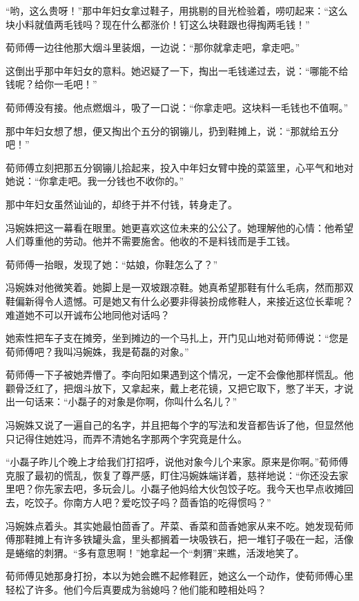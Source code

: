 \par “哟，这么贵呀！”那中年妇女拿过鞋子，用挑剔的目光检验着，唠叨起来：“这么块小料就值两毛钱吗？现在什么都涨价！钉这么块鞋跟也得掏两毛钱！”
\par 荀师傅一边往他那大烟斗里装烟，一边说：“那你就拿走吧，拿走吧。”
\par 这倒出乎那中年妇女的意料。她迟疑了一下，掏出一毛钱递过去，说：“哪能不给钱呢？给你一毛吧！”
\par 荀师傅没有接。他点燃烟斗，吸了一口说：“你拿走吧。这块料一毛钱也不值啊。”
\par 那中年妇女想了想，便又掏出个五分的钢镚儿，扔到鞋摊上，说：“那就给五分吧！”
\par 荀师傅立刻把那五分钢镚儿拾起来，投入中年妇女臂中挽的菜篮里，心平气和地对她说：“你拿走吧。我一分钱也不收你的。”
\par 那中年妇女虽然讪讪的，却终于并不付钱，转身走了。
\par 冯婉姝把这一幕看在眼里。她更喜欢这位未来的公公了。她理解他的心情：他希望人们尊重他的劳动。他并不需要施舍。他收的不是料钱而是手工钱。
\par 荀师傅一抬眼，发现了她：“姑娘，你鞋怎么了？”
\par 冯婉姝对他微笑着。她脚上是一双坡跟凉鞋。她真希望那鞋有什么毛病，然而那双鞋偏新得令人遗憾。可是她又有什么必要非得装扮成修鞋人，来接近这位长辈呢？难道她不可以开诚布公地同他对话吗？
\par 她索性把车子支在摊旁，坐到摊边的一个马扎上，开门见山地对荀师傅说：“您是荀师傅吧？我叫冯婉姝，我是荀磊的对象。”
\par 荀师傅一下子被她弄懵了。李向阳如果遇到这个情况，一定不会像他那样慌乱。他颧骨泛红了，把烟斗放下，又拿起来，戴上老花镜，又把它取下，憋了半天，才说出一句话来：“小磊子的对象是你啊，你叫什么名儿？”
\par 冯婉姝又说了一遍自己的名字，并且把每个字的写法和发音都告诉了他，但显然他只记得住她姓冯，而弄不清她名字那两个字究竟是什么。
\par “小磊子昨儿个晚上才给我们打招呼，说他对象今儿个来家。原来是你啊。”荀师傅克服了最初的慌乱，恢复了尊严感，盯住冯婉姝端详着，慈祥地说：“你还没去家里吧？你先家去吧，多玩会儿。小磊子他妈给大伙包饺子吃。我今天也早点收摊回去，吃饺子。你南方人吧？爱吃饺子吗？茴香馅的吃得惯吗？”
\par 冯婉姝点着头。其实她最怕茴香了。芹菜、香菜和茴香她家从来不吃。她发现荀师傅那鞋摊上有许多铁罐头盒，里头都搁着一块吸铁石，把一堆钉子吸在一起，活像是蜷缩的刺猬。“多有意思啊！”她拿起一个“刺猬”来瞧，活泼地笑了。
\par 荀师傅见她那身打扮，本以为她会瞧不起修鞋匠，她这么一个动作，使荀师傅心里轻松了许多。他们今后真要成为翁媳吗？他们能和睦相处吗？

